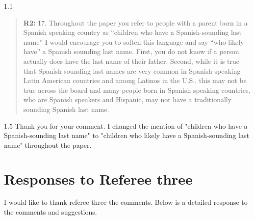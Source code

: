 \documentclass[12pt,english]{article}
\newcommand{\rrquote}{1.1}
\newcommand{\rrxspc}{1.5}
\begin{document}
\begin{refsection}
    \begin{spacing}{\rrquote}
        \begin{quotation}
        \textbf{R2: } 17. Throughout the paper you refer to people with a parent born in a Spanish speaking country as “children who have a Spanish-sounding last name” I would encourage you to soften this language and say “who likely have” a Spanish sounding last name. First, you do not know if a person actually does have the last name of their father. Second, while it is true that Spanish sounding last names are very common in Spanish-speaking Latin American countries and among Latinos in the U.S., this may not be true across the board and many people born in Spanish speaking countries, who are Spanish speakers and Hispanic, may not have a traditionally sounding Spanish last name.
    
        \end{quotation}
        \end{spacing}
        
        \begin{spacing}{\rrxspc}
            Thank you for your comment. I changed the mention of "children who have a Spanish-sounding last name" to "children who likely have a Spanish-sounding last name" throughout the paper.
    \end{spacing}
    \end{refsection}

    \clearpage
    \pagebreak

    \section{Responses to Referee three}
    I would like to thank referee three the comments. Below is a detailed response to the comments and suggestions.
\end{document}
